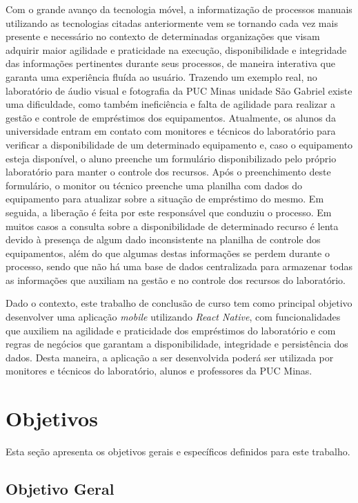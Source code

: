     Com o grande avanço da tecnologia móvel, a informatização de processos manuais utilizando as tecnologias citadas anteriormente vem se tornando cada vez mais presente e necessário no contexto de determinadas organizações que visam adquirir maior agilidade e praticidade na execução, disponibilidade e integridade das informações pertinentes durante seus processos, de maneira interativa que garanta uma experiência fluída ao usuário. Trazendo um exemplo real, no laboratório de áudio visual e fotografia da PUC Minas unidade São Gabriel existe uma dificuldade, como também ineficiência e falta de agilidade para realizar a gestão e controle de empréstimos dos equipamentos. Atualmente, os alunos da universidade entram em contato com monitores e técnicos do laboratório para verificar a disponibilidade de um determinado equipamento e, caso o equipamento esteja disponível, o aluno preenche um formulário disponibilizado pelo próprio laboratório para manter o controle dos recursos. Após o preenchimento deste formulário, o monitor ou técnico preenche uma planilha com dados do equipamento para atualizar sobre a situação de empréstimo do mesmo. Em seguida, a liberação é feita por este responsável que conduziu o processo. Em muitos casos a consulta sobre a disponibilidade de determinado recurso é lenta devido à presença de algum dado inconsistente na planilha de controle dos equipamentos, além do que algumas destas informações se perdem durante o processo, sendo que não há uma base de dados centralizada para armazenar todas as informações que auxiliam na gestão e no controle dos recursos do laboratório.
    
    Dado o contexto, este trabalho de conclusão de curso tem como principal objetivo desenvolver uma aplicação \textit{mobile} utilizando \textit{React Native}, com funcionalidades que auxiliem na agilidade e praticidade dos empréstimos do laboratório e com regras de negócios que garantam a disponibilidade, integridade e persistência dos dados. Desta maneira, a aplicação a ser desenvolvida poderá ser utilizada por monitores e técnicos do laboratório, alunos e professores da PUC Minas.


\section{Objetivos}
\label{secao1}

    Esta seção apresenta os objetivos gerais e específicos definidos para este trabalho.

\subsection{Objetivo Geral}
  
